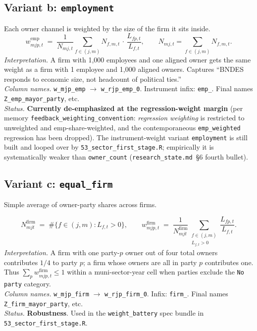 \documentclass[12pt]{article}
\theoremstyle{definition}
\begin{document}
\subsection{Variant b: \texttt{employment}}
Each owner channel is weighted by the size of the firm it sits inside.
\begin{equation}
w^{\text{emp}}_{m j p, t} \;=\; \frac{1}{N_{m j, t}}
\sum_{f \in (j,m)} N_{f,m,t}\,\cdot\,\frac{L_{fp,t}}{L_{f,t}},
\qquad
N_{m j, t} = \sum_{f \in (j,m)} N_{f,m,t}.
\end{equation}
\textit{Interpretation.} A firm with 1{,}000 employees and one aligned owner gets the same weight as a firm with 1 employee and 1{,}000 aligned owners. Captures ``BNDES responds to economic size, not headcount of political ties.''\\
\textit{Column names.} \texttt{w\_mjp\_emp} $\to$ \texttt{w\_rjp\_emp\_0}. Instrument infix: \texttt{emp\_}. Final names \texttt{Z\_emp\_mayor\_party}, etc.\\
\textit{Status.} \textbf{Currently de-emphasized at the regression-weight margin} (per memory \texttt{feedback\_weighting\_convention}: \emph{regression weighting} is restricted to unweighted and emp-share-weighted, and the contemporaneous \texttt{emp\_weighted} regression has been dropped). The instrument-weight variant \texttt{employment} is still built and looped over by \texttt{53\_sector\_first\_stage.R}; empirically it is systematically weaker than \texttt{owner\_count} (\texttt{research\_state.md}~\S6 fourth bullet).

\subsection{Variant c: \texttt{equal\_firm}}
Simple average of owner-party shares across firms.

\begin{equation}
N^{\mathrm{firm}}_{mjt}
\;=\;
\#\{f \in (j,m) : L_{f,t} > 0\},
\qquad
w^{\text{firm}}_{m j p, t} \;=\;
\frac{1}{N^{\mathrm{firm}}_{mjt}}
\sum_{\substack{f \in (j,m)\\ L_{f,t}>0}}
\frac{L_{fp,t}}{L_{f,t}}.
\end{equation}
\textit{Interpretation.} A firm with one party-$p$ owner out of four total owners contributes $1/4$ to party $p$; a firm whose owners are all in party $p$ contributes one. Thus $\sum_p w^{\text{firm}}_{mjp,t}\le 1$ within a muni-sector-year cell when parties exclude the \texttt{No party} category.\\
\textit{Column names.} \texttt{w\_mjp\_firm} $\to$ \texttt{w\_rjp\_firm\_0}. Infix: \texttt{firm\_}. Final names \texttt{Z\_firm\_mayor\_party}, etc.\\
\textit{Status.} \textbf{Robustness}. Used in the \texttt{weight\_battery} spec bundle in \texttt{53\_sector\_first\_stage.R}.
\end{document}
